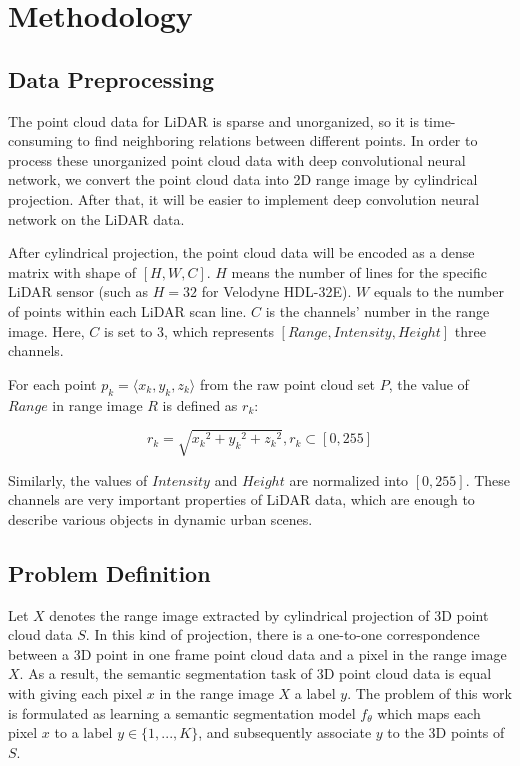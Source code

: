 \section{Methodology}

\subsection{Data Preprocessing}
The point cloud data for LiDAR is sparse and unorganized, so it is time-consuming to find neighboring relations between different points. In order to process these unorganized point cloud data with deep convolutional neural network, we convert the point cloud data into 2D range image by cylindrical projection. After that, it will be easier to implement deep convolution neural network on the LiDAR data.

After cylindrical projection, the point cloud data will be encoded as a dense matrix with shape of $[H,W,C]$. $H$ means the number of lines for the specific LiDAR sensor (such as $H=32$ for Velodyne HDL-32E). $W$ equals to the number of points within each LiDAR scan line. $C$ is the channels' number in the range image. Here, $C$ is set to 3, which represents $[Range,Intensity,Height]$ three channels.

For each point $p_k=\langle x_k,y_k,z_k\rangle$ from the raw point cloud set $P$, the value of $Range$ in range image $R$ is defined as $r_k$:
 
\begin{equation}
r_k=\sqrt{{x_k}^2+{y_k}^2+{z_k}^2},  r_k\subset [0,255]	
\end{equation} 

Similarly, the values of $Intensity$ and $Height$ are normalized into $[0,255]$. These channels are very important properties of LiDAR data, which are enough to describe various objects in dynamic urban scenes.
 
\subsection{Problem Definition}

Let $X$ denotes the range image extracted by cylindrical projection of 3D point cloud data $S$. In this kind of projection, there is a one-to-one correspondence between a 3D point in one frame point cloud data and a pixel in the range image $X$. As a result, the semantic segmentation task of 3D point cloud data is equal with giving each pixel $x$ in the range image $X$ a label $y$. The problem of this work is formulated as learning a semantic segmentation model $f_{\theta}$ which maps each pixel $x$ to a label $y\in\{1,...,K\}$, and subsequently associate $y$ to the 3D points of $S$.

